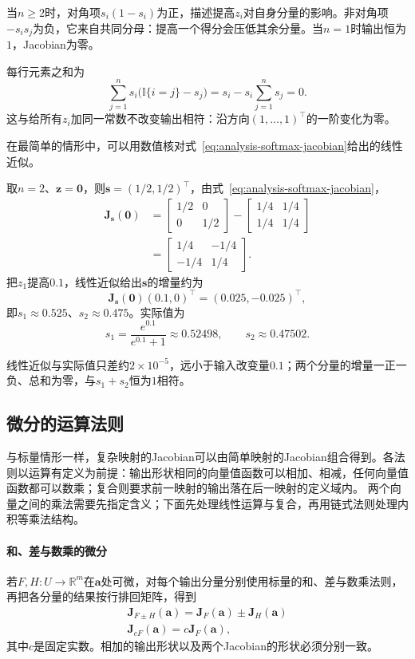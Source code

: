 当$n\geq2$时，对角项$s_i(1-s_i)$为正，描述提高$z_i$对自身分量的影响。非对角项$-s_is_j$为负，它来自共同分母：提高一个得分会压低其余分量。当$n=1$时输出恒为$1$，Jacobian为零。

每行元素之和为
\[
 \sum_{j=1}^ns_i\bigl(\mathbb I\{i=j\}-s_j\bigr)=s_i-s_i\sum_{j=1}^ns_j=0.
\]
这与给所有$z_i$加同一常数不改变输出相符：沿方向$(1,\ldots,1)^\top$的一阶变化为零。

在最简单的情形中，可以用数值核对式~\eqref{eq:analysis-softmax-jacobian}给出的线性近似。
\begin{example}[二维softmax的Jacobian矩阵]
\label{ex:multivariable-softmax-jacobian-check}
取$n=2$、$\bm z=\bm 0$，则$\bm s=(1/2,1/2)^\top$，由式~\eqref{eq:analysis-softmax-jacobian}，
\[
 \begin{aligned}
 \bm J_{\bm s}(\bm 0)
 &=\begin{bmatrix}1/2&0\\0&1/2\end{bmatrix}-\begin{bmatrix}1/4&1/4\\1/4&1/4\end{bmatrix}\\
 &=\begin{bmatrix}1/4&-1/4\\-1/4&1/4\end{bmatrix}.
 \end{aligned}
\]
把$z_1$提高$0.1$，线性近似给出$\bm s$的增量约为
\[
 \bm J_{\bm s}(\bm 0)(0.1,0)^\top=(0.025,-0.025)^\top,
\]
即$s_1\approx0.525$、$s_2\approx0.475$。实际值为
\[
 s_1=\frac{e^{0.1}}{e^{0.1}+1}\approx0.52498,\qquad s_2\approx0.47502.
\]
\end{example}

线性近似与实际值只差约$2\times10^{-5}$，远小于输入改变量$0.1$；两个分量的增量一正一负、总和为零，与$s_1+s_2$恒为$1$相符。

\subsection{微分的运算法则}
\label{sec:analysis-vector-chain-matrix-calculus}

与标量情形一样，复杂映射的Jacobian可以由简单映射的Jacobian组合得到。各法则以运算有定义为前提：输出形状相同的向量值函数可以相加、相减，任何向量值函数都可以数乘；复合则要求前一映射的输出落在后一映射的定义域内。
两个向量之间的乘法需要先指定含义；下面先处理线性运算与复合，再用链式法则处理内积等乘法结构。

\paragraph{和、差与数乘的微分}
若$F,H:U\to\mathbb R^m$在$\bm a$处可微，对每个输出分量分别使用标量的和、差与数乘法则，再把各分量的结果按行排回矩阵，得到
\[
 \begin{gathered}
 \bm J_{F\pm H}(\bm a)=\bm J_F(\bm a)\pm\bm J_H(\bm a)\\
 \bm J_{cF}(\bm a)=c\bm J_F(\bm a),
 \end{gathered}
\]
其中$c$是固定实数。相加的输出形状以及两个Jacobian的形状必须分别一致。

